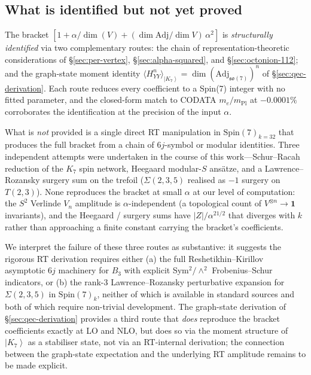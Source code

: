 \documentclass[11pt]{article}
\newcommand{\so}{\mathfrak{so}}
\newcommand{\Spin}{\mathrm{Spin}}
\newcommand{\Adj}{\mathrm{Adj}}
\newcommand{\ket}[1]{\left|#1\right\rangle}
\newcommand{\mPl}{m_{\mathrm{Pl}}}
\begin{document}
\subsection{What is identified but not yet proved}
\label{sec:what-identified}

The bracket $[1 + \alpha/\dim(V) + (\dim \Adj/\dim V)\,\alpha^2]$
is \emph{structurally identified} via two complementary routes:
the chain of representation-theoretic considerations of
\S\ref{sec:per-vertex}, \S\ref{sec:alpha-squared}, and
\S\ref{sec:octonion-112}; and the graph-state moment identity
$\langle H_{YY}^n\rangle_{\ket{K_7}} = \dim(\Adj_{\so(7)})^n$ of
\S\ref{sec:qec-derivation}.  Each route reduces every coefficient
to a Spin(7) integer with no fitted parameter, and the closed-form
match to CODATA $m_e/\mPl$ at $-0.0001\%$ corroborates the
identification at the precision of the input $\alpha$.

What is \emph{not} provided is a single direct RT manipulation in
$\Spin(7)_{k=32}$ that produces the full bracket from a chain of
6$j$-symbol or modular identities.  Three independent attempts
were undertaken in the course of this work---Schur--Racah
reduction of the $K_7$ spin network, Heegaard modular-$S$ ans\"atze,
and a Lawrence--Rozansky surgery sum on the trefoil ($\Sigma(2,3,5)$
realised as $-1$ surgery on $T(2,3)$).  None reproduces the bracket
at small $\alpha$ at our level of computation: the $S^2$ Verlinde
$V_n$ amplitude is $\alpha$-independent (a topological count of
$V^{\otimes n} \to \mathbf{1}$ invariants), and the Heegaard /
surgery sums have $|Z|/\alpha^{21/2}$ that diverges with $k$ rather
than approaching a finite constant carrying the bracket's
coefficients.

We interpret the failure of these three routes as substantive: it
suggests the rigorous RT derivation requires either (a) the full
Reshetikhin--Kirillov asymptotic 6$j$ machinery for $B_3$ with
explicit Sym$^2/\wedge^2$ Frobenius--Schur indicators, or (b) the
rank-3 Lawrence--Rozansky perturbative expansion for $\Sigma(2,3,5)$
in $\Spin(7)_k$, neither of which is available in standard sources
and both of which require non-trivial development.  The graph-state
derivation of \S\ref{sec:qec-derivation} provides a third route that
\emph{does} reproduce the bracket coefficients exactly at LO and
NLO, but does so via the moment structure of $\ket{K_7}$ as a
stabiliser state, not via an RT-internal derivation; the connection
between the graph-state expectation and the underlying RT amplitude
remains to be made explicit.
\end{document}
